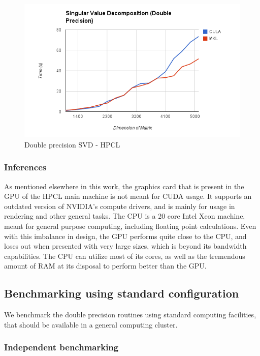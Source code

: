 \documentclass[submit]{aiaa-tc_mod}%
\begin{document}
\begin{figure}[H]
 \includegraphics[width=\textwidth]{hpcldgesvd.png}
 \caption{Double precision SVD - HPCL}
 \label{hpcldgesvd}
\end{figure}

\subsubsection{Inferences}

As mentioned elsewhere in this work, the graphics card that is present in the GPU of the HPCL main machine is not meant for CUDA usage. It supports an outdated version of NVIDIA's compute drivers, and is mainly for usage in rendering and other general tasks. The CPU is a 20 core Intel Xeon machine, meant for general purpose computing, including floating point calculations. Even with this imbalance in design, the GPU performs quite close to the CPU, and loses out when presented with very large sizes, which is beyond its bandwidth capabilities. The CPU can utilize most of its cores, as well as the tremendous amount of RAM at its disposal to perform better than the GPU. 

\subsection{Benchmarking using standard configuration}

We benchmark the double precision routines using standard computing facilities, that should be available in a general computing cluster. 
\subsubsection{Independent benchmarking}
\end{document}
